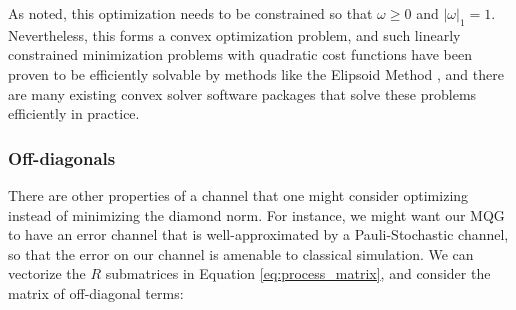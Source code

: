 \documentclass[aps,nofootinbib,pra,notitlepage,twocolumn]{revtex4-1}
\begin{document}
As noted, this optimization needs to be constrained so that $\omega \geq 0$ and $|\omega|_1 = 1$. Nevertheless, this forms a convex optimization problem, and such linearly constrained minimization problems with quadratic cost functions have been proven to be efficiently solvable by methods like the Elipsoid Method \cite{wright1999numerical, khachiyan}, and there are many existing convex solver software packages that solve these problems efficiently in practice.






\subsubsection{Off-diagonals} %
\label{sub:off_diagonals}
There are other properties of a channel that one might consider optimizing instead of minimizing the diamond norm. For instance, we might want our MQG to have an error channel that is well-approximated by a Pauli-Stochastic channel, so that the error on our channel is amenable to classical simulation. We can vectorize the $R$ submatrices in Equation \ref{eq:process_matrix}, and consider the matrix of off-diagonal terms:
\end{document}
